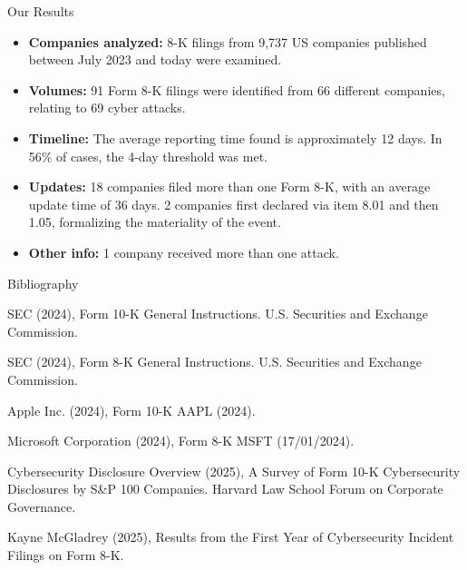 \documentclass{beamer}
\begin{document}
\begin{frame}{Our Results}
\begin{itemize}
\item \textbf{Companies analyzed:} 8-K filings from 9,737 US companies published between July 2023 and today were examined.
\item \textbf{Volumes:} 91 Form 8-K filings were identified from 66 different companies, relating to 69 cyber attacks.
\item \textbf{Timeline:} The average reporting time found is approximately 12 days. In 56\% of cases, the 4-day threshold was met.
\item \textbf{Updates:} 18 companies filed more than one Form 8-K, with an average update time of 36 days. 2 companies first declared via item 8.01 and then 1.05, formalizing the materiality of the event.
\item \textbf{Other info:} 1 company received more than one attack.
\end{itemize}
\end{frame}

\begin{frame}{Bibliography}
\footnotesize{
SEC (2024), Form 10-K General Instructions. U.S. Securities and Exchange Commission.

SEC (2024), Form 8-K General Instructions. U.S. Securities and Exchange Commission.

Apple Inc. (2024), Form 10-K AAPL (2024).

Microsoft Corporation (2024), Form 8-K MSFT (17/01/2024).

Cybersecurity Disclosure Overview (2025), A Survey of Form 10-K Cybersecurity Disclosures by S\&P 100 Companies. Harvard Law School Forum on Corporate Governance.

Kayne McGladrey (2025), Results from the First Year of Cybersecurity Incident Filings on Form 8-K.
}
\end{frame}
\end{document}
